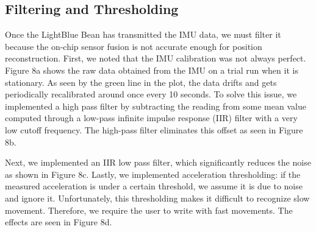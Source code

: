 \documentclass[10pt,journal]{IEEEtran}
\begin{document}
\subsection{Filtering and Thresholding}
  Once the LightBlue Bean has transmitted the IMU data, we must filter it because the on-chip sensor fusion is not accurate enough for position reconstruction. First, we noted that the IMU calibration was not always perfect. Figure 8a shows the raw data obtained from the IMU on a trial run when it is stationary. As seen by the green line in the plot, the data drifts and gets periodically recalibrated around once every 10 seconds. To solve this issue, we implemented a high pass filter by subtracting the reading from some mean value computed through a low-pass infinite impulse response (IIR) filter with a very low cutoff frequency. The high-pass filter eliminates this offset as seen in Figure 8b.
\par Next, we implemented an IIR low pass filter, which significantly reduces the noise as shown in Figure 8c.
  Lastly, we implemented acceleration thresholding: if the measured acceleration is under a certain threshold, we assume it is due to noise and ignore it. Unfortunately, this thresholding makes it difficult to recognize slow movement. Therefore, we require the user to write with fast movements. The effects are seen in Figure 8d.
\end{document}

